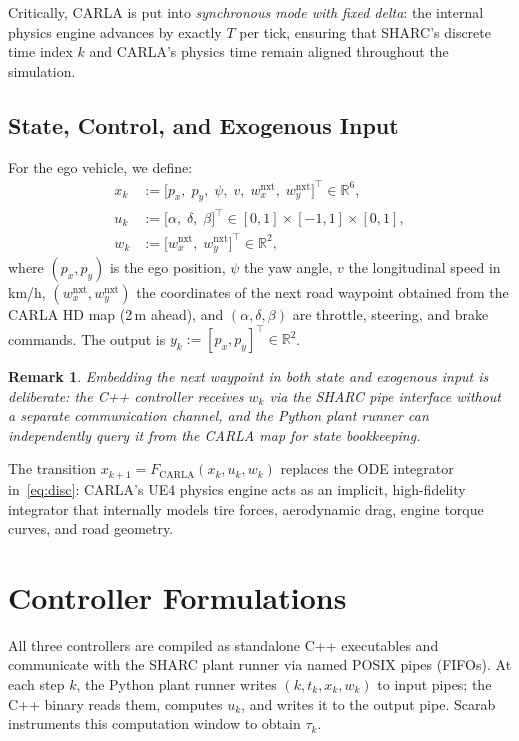\documentclass[conference]{IEEEtran}
\newcommand{\R}{\mathbb{R}}
\newtheorem{remark}{Remark}
\begin{document}
Critically, CARLA is put into \emph{synchronous mode with fixed
  delta}: the internal physics engine advances by exactly $T$ per tick,
ensuring that SHARC's discrete time index $k$ and CARLA's physics time
remain aligned throughout the simulation.

\subsection{State, Control, and Exogenous Input}

For the ego vehicle, we define:
\begin{align}
  x_k &:= \bigl[p_x,\; p_y,\; \psi,\; v,\; w_x^{\mathrm{nxt}},\;
    w_y^{\mathrm{nxt}}\bigr]^\top \in \R^6, \label{eq:state}\\
  u_k &:= \bigl[\alpha,\; \delta,\; \beta\bigr]^\top \in
    [0, 1] \times [-1, 1] \times [0, 1], \label{eq:control}\\
  w_k &:= \bigl[w_x^{\mathrm{nxt}},\; w_y^{\mathrm{nxt}}\bigr]^\top
    \in \R^2, \label{eq:exo}
\end{align}
where $(p_x, p_y)$ is the ego position, $\psi$ the yaw angle,
$v$ the longitudinal speed in km/h, $(w_x^{\mathrm{nxt}},
w_y^{\mathrm{nxt}})$ the coordinates of the next road waypoint
obtained from the CARLA HD map (2\,m ahead), and $(\alpha, \delta,
\beta)$ are throttle, steering, and brake commands.  The output is
$y_k := [p_x, p_y]^\top \in \R^2$.

\begin{remark}
  Embedding the next waypoint in both state and exogenous input is deliberate:
  the C++ controller receives $w_k$ via the SHARC pipe interface without
  a separate communication channel, and the Python plant runner can
  independently query it from the CARLA map for state bookkeeping.
\end{remark}

The transition $x_{k+1} = F_{\mathrm{CARLA}}(x_k, u_k, w_k)$ replaces
the ODE integrator in~\eqref{eq:disc}: CARLA's UE4 physics engine acts
as an implicit, high-fidelity integrator that internally models tire
forces, aerodynamic drag, engine torque curves, and road geometry.

\section{Controller Formulations}\label{sec:controllers}

All three controllers are compiled as standalone C++ executables and
communicate with the SHARC plant runner via named POSIX pipes (FIFOs).
At each step $k$, the Python plant runner writes $(k, t_k, x_k, w_k)$
to input pipes; the C++ binary reads them, computes $u_k$, and writes
it to the output pipe.  Scarab instruments this computation window to
obtain $\tau_k$.
\end{document}
